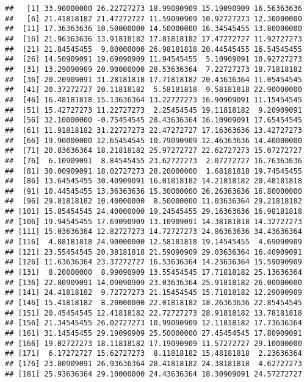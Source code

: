 \documentclass[]{book}
\begin{document}
\begin{verbatim}
##   [1] 33.90000000 26.22727273 18.99090909 15.19090909 16.56363636
##   [6] 21.41818182 21.47272727 11.59090909 10.92727273 12.30000000
##  [11] 17.36363636 10.50000000 14.50000000 16.34545455 13.80000000
##  [16] 21.96363636 13.91818182 17.81818182 17.47272727 11.92727273
##  [21] 21.84545455  9.80000000 26.98181818 20.44545455 16.54545455
##  [26] 14.50909091 19.69090909 11.94545455  5.10909091 10.92727273
##  [31] 13.29090909 20.90000000 28.53636364  7.22727273 18.71818182
##  [36] 20.20909091 31.28181818 17.71818182 20.43636364 11.05454545
##  [41] 20.37272727 20.11818182  5.58181818  9.58181818 22.90000000
##  [46] 16.48181818 15.13636364 13.22727273 16.90909091 11.15454545
##  [51] 15.42727273 11.22727273  2.25454545 19.11818182  9.20909091
##  [56] 32.10000000 -0.75454545 28.43636364 16.10909091 17.65454545
##  [61] 11.91818182 31.22727273 22.47272727 17.16363636 13.42727273
##  [66] 19.90000000 12.65454545 10.79090909 12.46363636 14.40000000
##  [71] 20.83636364 18.21818182 25.97272727 22.62727273 15.07272727
##  [76]  6.10909091  8.84545455 23.62727273  2.07272727 16.76363636
##  [81] 30.00909091 18.02727273 28.20000000  1.68181818 19.74545455
##  [86] 13.64545455 30.40909091 16.01818182 14.21818182 20.48181818
##  [91] 10.44545455 13.36363636 15.30000000 26.26363636 16.80000000
##  [96] 29.81818182 10.40000000  8.50000000 11.03636364 29.21818182
## [101] 15.85454545 24.40000000 19.24545455 29.16363636 16.98181818
## [106] 19.94545455 17.69090909 13.10909091 14.38181818 14.32727273
## [111] 15.03636364 12.82727273 14.72727273 24.86363636 34.43636364
## [116]  4.88181818 24.90000000 12.58181818 19.14545455  4.69090909
## [121] 23.55454545 20.38181818 21.59090909 29.03636364 16.40909091
## [126] 11.63636364 23.37272727 16.53636364 14.23636364 15.59090909
## [131]  8.20000000  8.99090909 13.55454545 17.71818182 25.13636364
## [136] 22.80909091 14.09090909 23.03636364 25.91818182 26.00000000
## [141] 24.41818182  9.72727273 21.15454545 15.71818182 12.29090909
## [146] 15.41818182  8.20000000 22.01818182 18.26363636 22.85454545
## [151] 20.45454545 12.41818182 22.72727273 28.91818182 13.78181818
## [156] 21.34545455 26.02727273 10.99090909 12.11818182 17.73636364
## [161] 31.14545455 29.19090909 25.50000000 27.45454545 17.80909091
## [166] 19.02727273 18.11818182 17.19090909 11.57272727 29.10000000
## [171]  6.17272727 15.62727273  8.11818182 15.48181818  2.23636364
## [176] 23.80909091 26.93636364 28.41818182 24.38181818  4.62727273
## [181] 25.93636364 29.10000000 24.43636364 18.30909091 24.57272727

\end{verbatim}
\end{document}
